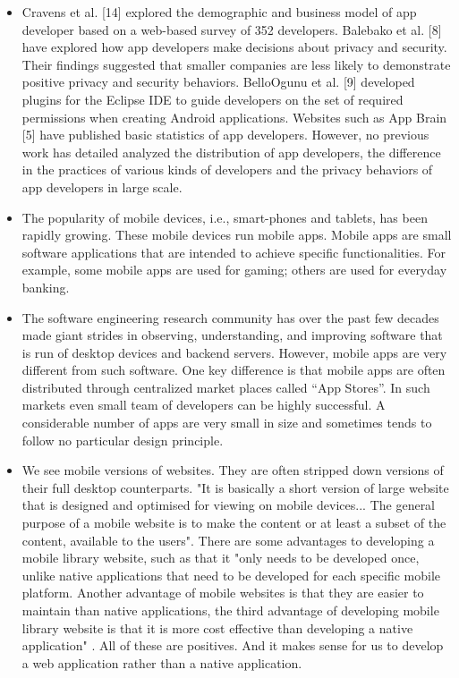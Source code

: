 \begin{itemize}
        \item
        Cravens et al. [14] explored the demographic and business model of app developer based on a web-based survey of 352 developers. Balebako et al. [8] have explored how app developers make decisions about privacy and security. Their findings suggested that smaller companies are less likely to demonstrate positive privacy and security behaviors. BelloOgunu et al. [9] developed plugins for the Eclipse IDE to guide developers on the set of required permissions when creating Android applications. Websites such as App Brain [5] have published basic statistics of app developers. However, no previous work has detailed analyzed the distribution of app developers, the difference in the practices of various kinds of developers and the privacy behaviors of app developers in large scale.\cite{Mobile_App_Ecosystem}
        \item
        The popularity of mobile devices, i.e., smart-phones and tablets, has been rapidly growing. These mobile devices run mobile apps. Mobile apps are small software applications that are intended to achieve specific functionalities. For example, some mobile apps are used for gaming; others are used for everyday banking.\cite{Challenges_in_Mobile_Apps}
        \item
        The software engineering research community has over the past few decades made giant strides in observing, understanding, and improving software that is run of desktop devices and backend servers. However, mobile apps are very different from such software. One key difference is that mobile apps are often distributed through centralized market places called “App Stores”. In such markets even small team of developers can be highly successful. A considerable number of apps are very small in size and sometimes tends to follow no particular design principle.\cite{Challenges_in_Mobile_Apps}
        \item
        We see mobile versions of websites. They are often stripped down versions of their full desktop counterparts. "It is basically a short version of large website that is designed and optimised for viewing on mobile devices... The general purpose of a mobile website is to make the content or at least a subset of the content, available to the users". There are some advantages to developing a mobile library website, such as that it "only needs to be developed once, unlike native applications that need to be developed for each specific mobile platform. Another advantage of mobile websites is that they are easier to maintain than native applications, the third advantage of developing mobile library website is that it is more cost effective than developing a native application" \cite{misodi}. All of these are positives. And it makes sense for us to develop a web application rather than a native application.
        
    \end{itemize}

